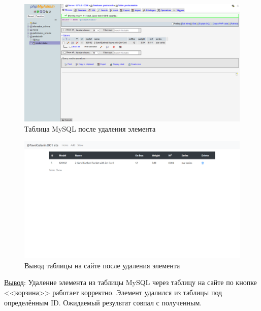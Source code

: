 \begin{figure}[!htp]
    \begin{center}
        \includegraphics[width=12cm]{../_input/tests/mysql_table_after_deleting.png}
    \end{center}
    \caption{Таблица MySQL после удаления элемента\label{fig:mysql_table_after_deleting}}
\end{figure}

\begin{figure}[!htp]
    \begin{center}
        \includegraphics[width=12cm]{../_input/tests/site_table_after_deleting.png}
    \end{center}
    \caption{Вывод таблицы на сайте после удаления элемента\label{fig:site_table_after_deleting}}
\end{figure}

\underline{Вывод}:
Удаление элемента из таблицы MySQL через таблицу на сайте по кнопке <<корзина>> работает корректно. Элемент удалился из таблицы под определённым ID. Ожидаемый результат совпал с полученным.
